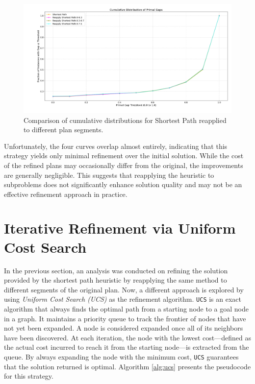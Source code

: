 \begin{figure}[ht]
	\centering
	\includegraphics[width=\textwidth]{images/reapply_full.png}
	\caption{Comparison of cumulative distributions for Shortest Path reapplied to different plan segments.}
	\label{fig:reapply}
\end{figure}

Unfortunately, the four curves overlap almost entirely, indicating that this strategy yields only minimal refinement over the initial solution.
While the cost of the refined plans may occasionally differ from the original, the improvements are generally negligible.
This suggests that reapplying the heuristic to subproblems does not significantly enhance solution quality and may not be an effective
refinement approach in practice.

\section{Iterative Refinement via Uniform Cost Search}
In the previous section, an analysis was conducted on refining the solution provided by the shortest path heuristic by reapplying the same method
to different segments of the original plan.
Now, a different approach is explored by using \textit{Uniform Cost Search (UCS)} \cite{felner2011position} as the refinement algorithm.
\verb|UCS| is an exact algorithm that always finds the optimal path from a starting node to a goal node in a graph.
It maintains a priority queue to track the frontier of nodes that have not yet been expanded. A node is considered expanded once all of its
neighbors have been discovered.
At each iteration, the node with the lowest cost—defined as the actual cost incurred to reach it from the starting node—is extracted from the queue.
By always expanding the node with the minimum cost, \verb|UCS| guarantees that the solution returned is optimal.
Algorithm \ref{alg:ucs} presents the pseudocode for this strategy.

